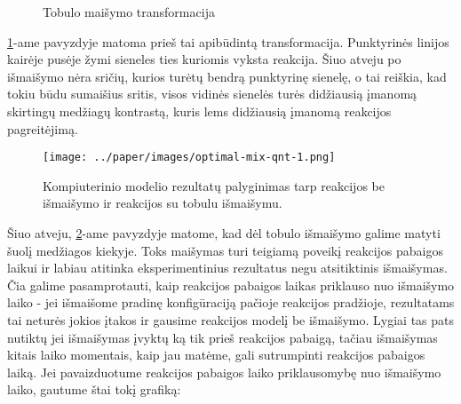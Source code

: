 \begin{figure}[!h]
\centering
{}
\caption{Tobulo maišymo transformacija}
\label{perfect-2x2-mix}
\end{figure}
\ref{perfect-2x2-mix}-ame pavyzdyje matoma prieš tai apibūdintą transformacija. Punktyrinės linijos kairėje pusėje žymi sieneles ties kuriomis vyksta reakcija. Šiuo atveju po išmaišymo nėra sričių, kurios turėtų bendrą punktyrinę sienelę, o tai reiškia, kad tokiu būdu sumaišius sritis, visos vidinės sienelės turės didžiausią įmanomą skirtingų medžiagų kontrastą, kuris lems didžiausią įmanomą reakcijos pagreitėjimą.
\newpage
\begin{figure}[h!]
    \centering
    \texttt{[image: ../paper/images/optimal-mix-qnt-1.png]}

    \caption{Kompiuterinio modelio rezultatų palyginimas tarp reakcijos be išmaišymo ir reakcijos su tobulu išmaišymu.  }

    \label{optimal-mix-qnt}
\end{figure}

Šiuo atveju, \ref{optimal-mix-qnt}-ame pavyzdyje matome, kad dėl tobulo išmaišymo galime matyti šuolį medžiagos kiekyje. Toks maišymas turi teigiamą poveikį reakcijos pabaigos laikui ir labiau atitinka eksperimentinius rezultatus negu atsitiktinis išmaišymas.
Čia galime pasamprotauti, kaip reakcijos pabaigos laikas priklauso nuo išmaišymo laiko - jei išmaišome pradinę konfigūraciją pačioje reakcijos pradžioje, rezultatams tai neturės jokios įtakos ir gausime reakcijos modelį be išmaišymo. Lygiai tas pats nutiktų jei išmaišymas įvyktų ką tik prieš reakcijos pabaigą, tačiau išmaišymas kitais laiko momentais, kaip jau matėme, gali sutrumpinti reakcijos pabaigos laiką. Jei pavaizduotume reakcijos pabaigos laiko priklausomybę nuo išmaišymo laiko, gautume štai tokį grafiką:

